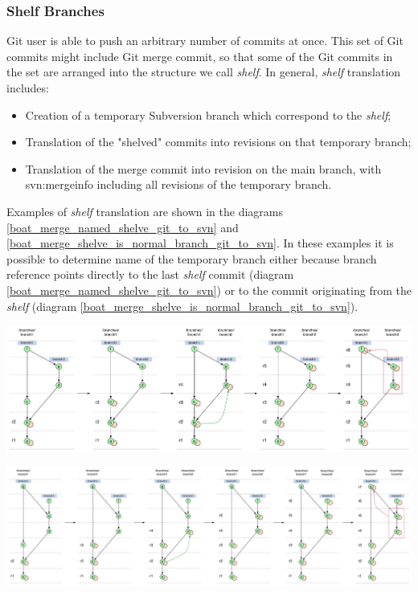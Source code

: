 \subsubsection{Shelf Branches}

Git user is able to push an arbitrary number of commits at once. This set of Git commits might include Git merge commit, 
so that some of the Git commits in the set are arranged into the structure we call \emph{shelf}. In general, \emph{shelf}
translation includes:
\begin{itemize}
\item Creation of a temporary Subversion branch which correspond to the \emph{shelf};
\item Translation of the "shelved" commits into revisions on that temporary branch;
\item Translation of the merge commit into revision on the main branch, with svn:mergeinfo including all revisions
of the temporary branch.
\end{itemize}
Examples of \emph{shelf} translation are shown in the diagrams \ref{boat_merge_named_shelve_git_to_svn} and \ref{boat_merge_shelve_is_normal_branch_git_to_svn}.
In these examples it is possible to determine name of the temporary branch either because branch reference points directly to the 
last \emph{shelf} commit (diagram \ref{boat_merge_named_shelve_git_to_svn}) or to the commit originating from the \emph{shelf} (diagram \ref{boat_merge_shelve_is_normal_branch_git_to_svn}).
\begin{center}
\includegraphics[width=\textwidth]{img/diagrams/boat_merge_named_shelve_git_to_svn.pdf}%
\label{boat_merge_named_shelve_git_to_svn}%
\end{center}
\begin{center}
\includegraphics[width=\textwidth]{img/diagrams/boat_merge_shelve_is_normal_branch_git_to_svn.pdf}%
\label{boat_merge_shelve_is_normal_branch_git_to_svn}%
\end{center}

